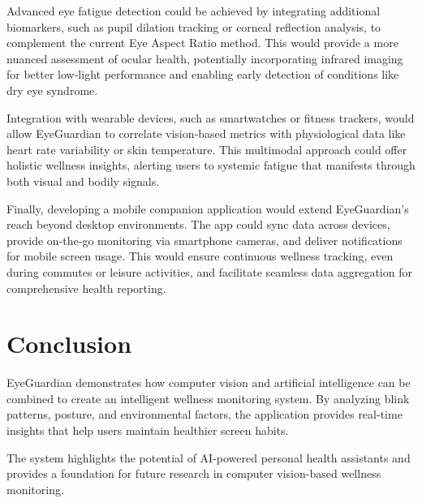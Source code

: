 \documentclass[12pt]{report}
\begin{document}
Advanced eye fatigue detection could be achieved by integrating additional biomarkers, such as pupil dilation tracking or corneal reflection analysis, to complement the current Eye Aspect Ratio method. This would provide a more nuanced assessment of ocular health, potentially incorporating infrared imaging for better low‑light performance and enabling early detection of conditions like dry eye syndrome.

Integration with wearable devices, such as smartwatches or fitness trackers, would allow EyeGuardian to correlate vision‑based metrics with physiological data like heart rate variability or skin temperature. This multimodal approach could offer holistic wellness insights, alerting users to systemic fatigue that manifests through both visual and bodily signals.

Finally, developing a mobile companion application would extend EyeGuardian’s reach beyond desktop environments. The app could sync data across devices, provide on‑the‑go monitoring via smartphone cameras, and deliver notifications for mobile screen usage. This would ensure continuous wellness tracking, even during commutes or leisure activities, and facilitate seamless data aggregation for comprehensive health reporting.


\chapter{Conclusion}

EyeGuardian demonstrates how computer vision and artificial intelligence can be combined to create an intelligent wellness monitoring system. By analyzing blink patterns, posture, and environmental factors, the application provides real-time insights that help users maintain healthier screen habits.

The system highlights the potential of AI-powered personal health assistants and provides a foundation for future research in computer vision-based wellness monitoring.
\end{document}
